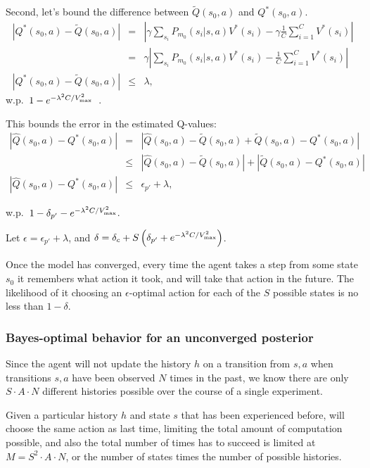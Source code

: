 Second, let's bound the difference between $\tilde Q(s_0, a)$ and $Q^*(s_0, a)$.
\begin{eqnarray}
\nonumber |Q^*(s_0, a) - \tilde Q(s_0, a)| &=& \left|\gamma \sum_{s_i} P_{m_0}(s_i|s,a)V^*(s_i) - \gamma \frac 1 C \sum_{i=1}^C V^*(s_i)\right|\\
\nonumber &=& \gamma \left|\sum_{s_i} P_{m_0}(s_i|s,a)V^*(s_i) - \frac 1 C \sum_{i=1}^C V^*(s_i)\right|\\
|Q^*(s_0, a) - \tilde Q(s_0, a)| &\leq& \lambda,
\end{eqnarray}
w.p.\ $1-e^{-\lambda^2 C / {V_{\rm max}^2}}$~\cite{kearns99b}.

This bounds the error in the estimated Q-values:
\begin{eqnarray}
\nonumber |\hat Q(s_0, a) - Q^*(s_0, a)| &=& |\hat Q(s_0, a) - \tilde Q(s_0, a) + \tilde Q(s_0, a) - Q^*(s_0, a)|\\
\nonumber &\leq& |\hat Q(s_0, a) - \tilde Q(s_0, a)| + |\tilde Q(s_0, a) - Q^*(s_0, a)|\\
|\hat Q(s_0, a) - Q^*(s_0, a)| &\leq& \epsilon_{p'}+\lambda,
\end{eqnarray}

w.p.\ $1 - \delta_{p'} - e^{-\lambda^2 C / {V_{\rm max}^2}}$.

Let $\epsilon = \epsilon_{p'}+\lambda$, and $\delta = \delta_c + S\left(\delta_{p'} + e^{-\lambda^2 C / {V_{\rm max}^2}}\right)$.

Once the model has converged, every time the agent takes a step from some state $s_0$ it remembers what action it took, and will take that action in the future. The likelihood of it choosing an $\epsilon$-optimal action for each of the $S$ possible states is no less than $1-\delta$.

\subsubsection{Bayes-optimal behavior for an unconverged posterior}

Since the agent will not update the history $h$ on a transition from $s,a$ when transitions $s,a$ have been observed $N$ times in the past, we know there are only $S \cdot A \cdot N$ different histories possible over the course of a single experiment.

Given a particular history $h$ and state $s$ that has been experienced before,  will choose the same action as last time, limiting the total amount of computation possible, and also the total number of times  has to succeed is limited at $M = S^2 \cdot A \cdot N$, or the number of states times the number of possible histories.


